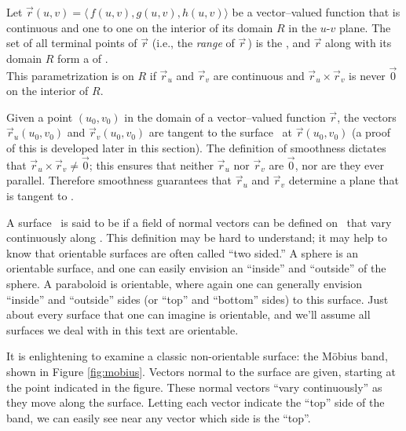{Let $\vec r(u,v) = \langle\, f(u,v),g(u,v),h(u,v)\rangle$ be a vector--valued function
that is continuous and one to one on the interior of its domain $R$ in the $u$-$v$ plane. The set of all terminal points of $\vec r$ (i.e., the \emph{range} of $\vec r$\,) is the  \surfaceS, and $\vec r$ along with its domain $R$ form a  of \surfaceS.\\

This parametrization is  on $R$ if $\vec r_u$ and $\vec r_v$ are continuous and $\vec r_u\times \vec r_v$ is never $\vec 0$ on the interior of $R$.
}


Given a point $(u_0,v_0)$ in the domain of a vector--valued function $\vec r$, the vectors $\vec r_u(u_0,v_0)$ and $\vec r_v(u_0,v_0)$ are tangent to the surface \surfaceS\ at $\vec r(u_0,v_0)$ (a proof of this is developed later in this section). The definition of smoothness dictates that $\vec r_u\times \vec r_v \neq \vec 0$; this ensures that neither $\vec r_u$ nor $\vec r_v$ are $\vec 0$, nor are they ever parallel. Therefore smoothness guarantees that $\vec r_u$ and $\vec r_v$ determine a plane that is tangent to \surfaceS.

A surface \surfaceS\ is said to be  if a field of normal vectors can be defined on \surfaceS\ that vary continuously along \surfaceS. This definition may be hard to understand; it may help to know that orientable surfaces are often called ``two sided.'' A sphere is an orientable surface, and one can easily envision an ``inside'' and ``outside'' of the sphere. A paraboloid is orientable, where again one can generally envision  ``inside'' and ``outside'' sides (or ``top'' and ``bottom'' sides) to this surface. Just about every surface that one can imagine is orientable, and we'll assume all surfaces we deal with in this text are orientable.

It is enlightening to examine a classic non-orientable surface: the M\"obius band, shown in Figure \ref{fig:mobius}. Vectors normal to the surface are given, starting at the point indicated in the figure. These normal vectors ``vary continuously'' as they move along the surface. Letting each vector indicate the ``top'' side of the band, we can easily see near any vector which side is the ``top''.

